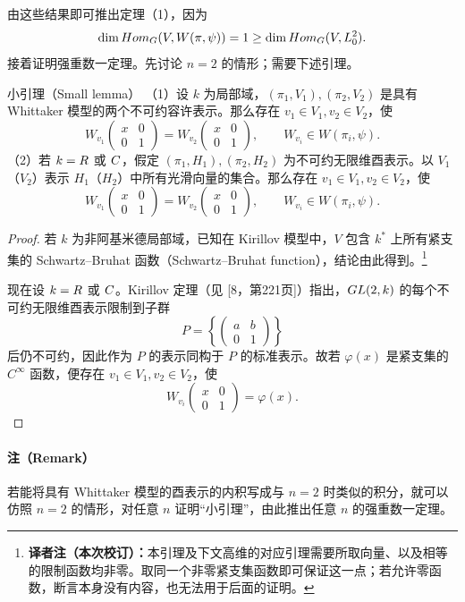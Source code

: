 由这些结果即可推出定理（1），因为
\[
\dim Hom_G(V,W(\pi,\psi))=1\geq\dim Hom_G(V,L_0^2).
\]
接着证明强重数一定理。先讨论 $n=2$ 的情形；需要下述引理。
\begin{originaltheorem}{小引理（Small lemma）}
（1）设 $k$ 为局部域，$(\pi_1,V_1),(\pi_2,V_2)$ 是具有 Whittaker 模型的两个不可约容许表示。那么存在 $v_1\in V_1,v_2\in V_2$，使
\[
W_{v_1}\begin{pmatrix}x&0\\0&1\end{pmatrix}
 =W_{v_2}\begin{pmatrix}x&0\\0&1\end{pmatrix},
\qquad W_{v_i}\in W(\pi_i,\psi).
\]
（2）若 $k=R$ 或 $C$，假定 $(\pi_1,H_1),(\pi_2,H_2)$ 为不可约无限维酉表示。以 $V_1$（$V_2$）表示 $H_1$（$H_2$）中所有光滑向量的集合。那么存在 $v_1\in V_1,v_2\in V_2$，使
\[
W_{v_1}\begin{pmatrix}x&0\\0&1\end{pmatrix}
 =W_{v_2}\begin{pmatrix}x&0\\0&1\end{pmatrix},
\qquad W_{v_i}\in W(\pi_i,\psi).
\]
\end{originaltheorem}
\begin{proof}
若 $k$ 为非阿基米德局部域，已知在 Kirillov 模型中，$V$ 包含 $k^*$ 上所有紧支集的 Schwartz--Bruhat 函数（Schwartz--Bruhat function），结论由此得到。\footnote{\textbf{译者注（本次校订）：}本引理及下文高维的对应引理需要所取向量、以及相等的限制函数均非零。取同一个非零紧支集函数即可保证这一点；若允许零函数，断言本身没有内容，也无法用于后面的证明。}

现在设 $k=R$ 或 $C$。Kirillov 定理（见 [8，第221页]）指出，$GL(2,k)$ 的每个不可约无限维酉表示限制到子群
\[
P=\left\{\begin{pmatrix}a&b\\0&1\end{pmatrix}\right\}
\]
后仍不可约，因此作为 $P$ 的表示同构于 $P$ 的标准表示。故若 $\varphi(x)$ 是紧支集的 $C^\infty$ 函数，便存在 $v_1\in V_1,v_2\in V_2$，使
\[
W_{v_i}\begin{pmatrix}x&0\\0&1\end{pmatrix}=\varphi(x).
\]
\end{proof}
\paragraph*{注（Remark）}
若能将具有 Whittaker 模型的酉表示的内积写成与 $n=2$ 时类似的积分，就可以仿照 $n=2$ 的情形，对任意 $n$ 证明“小引理”，由此推出任意 $n$ 的强重数一定理。

